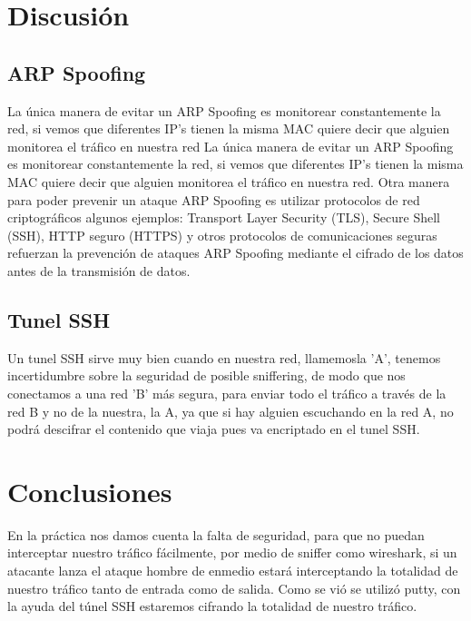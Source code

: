 \documentclass{article}
\begin{document}
\section{Discusi\'on}

\subsection{ARP Spoofing}
La \'unica manera de evitar un ARP Spoofing es monitorear constantemente la red, si vemos que diferentes IP's tienen la misma MAC quiere decir que alguien monitorea el tr\'afico en nuestra red
La \'unica manera de evitar un ARP Spoofing es monitorear constantemente la red, si vemos que diferentes IP's tienen la misma MAC quiere decir que alguien monitorea el tr\'afico en nuestra red. Otra manera para poder prevenir un ataque ARP Spoofing es utilizar protocolos de red criptogr\'aficos algunos ejemplos: Transport Layer Security (TLS), Secure Shell (SSH), HTTP seguro (HTTPS) y otros protocolos de comunicaciones seguras refuerzan la prevenci\'on de ataques ARP Spoofing mediante el cifrado de los datos antes de la transmisi\'on de datos.

\subsection{Tunel SSH}

Un tunel SSH sirve muy bien cuando en nuestra red, llamemosla 'A', tenemos incertidumbre sobre la seguridad de posible sniffering, de modo que nos conectamos a una red 'B' m\'as segura, para enviar todo el tr\'afico a trav\'es de la red B y no de la nuestra, la A, ya que si hay alguien escuchando en la red A, no podr\'a descifrar el contenido que viaja pues va encriptado en el tunel SSH.

\section{Conclusiones}
En la pr\'actica nos damos cuenta la falta de seguridad, para que no puedan interceptar nuestro tr\'afico f\'acilmente, por medio de sniffer como wireshark, 
si un atacante lanza el ataque hombre de enmedio estar\'a interceptando la totalidad de nuestro tr\'afico tanto de entrada como de salida. Como se vi\'o se utiliz\'o putty, con la ayuda del túnel SSH estaremos cifrando la totalidad de nuestro tráfico.
\end{document}
